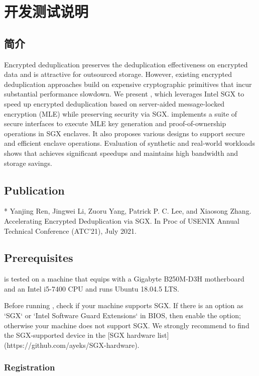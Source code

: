 \chapter{\sysnameS 开发测试说明}
\section{简介}

Encrypted deduplication preserves the deduplication effectiveness on encrypted data and is attractive for outsourced storage.  However, existing encrypted deduplication approaches build on expensive cryptographic primitives that incur substantial performance slowdown.  We present \sysnameS, which leverages Intel SGX to speed up encrypted deduplication based on server-aided message-locked encryption (MLE) while preserving security via SGX.  \sysnameS implements a suite of secure interfaces to execute MLE key generation and proof-of-ownership operations in SGX enclaves.  It also proposes various designs to support secure and efficient enclave operations.  Evaluation of synthetic and real-world workloads shows that \sysnameS achieves significant speedups and maintains high bandwidth and storage savings.

\section{Publication}

* Yanjing Ren, Jingwei Li, Zuoru Yang, Patrick P. C. Lee, and Xiaosong Zhang. Accelerating Encrypted Deduplication via SGX. In Proc of USENIX Annual Technical Conference (ATC'21), July 2021.

\section{Prerequisites}

\sysnameS is tested on a machine that equips with a Gigabyte B250M-D3H motherboard and an Intel i5-7400 CPU and runs Ubuntu 18.04.5 LTS.

Before running \sysnameS, check if your machine supports SGX. If there is an option as `SGX` or `Intel Software Guard Extensions` in BIOS, then enable the option; otherwise your machine does not support SGX.
We strongly recommend to find the SGX-supported device in the [SGX hardware list](https://github.com/ayeks/SGX-hardware).

\subsection{Registration}

